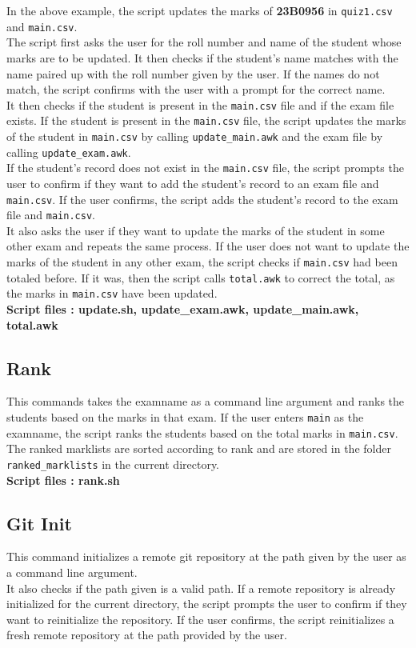 \documentclass{article}
\begin{document}
In the above example, the script updates the marks of \textbf{23B0956} in \verb"quiz1.csv" and \verb"main.csv".\\
The script first asks the user for the roll number and name of the student whose marks are to be updated. It then checks if the student's name matches with the name paired up with the roll number given by the user. If the names do not match, the script confirms with the user with a prompt for the correct name.\\
It then checks if the student is present in the \verb"main.csv" file and if the exam file exists. If the student is present in the \verb"main.csv" file, the script updates the marks of the student in \verb"main.csv" by calling \verb"update_main.awk" and the exam file by calling \verb"update_exam.awk".\\
If the student's record does not exist in the \verb"main.csv" file, the script prompts the user to confirm if they want to add the student's record to an exam file and \verb"main.csv". If the user confirms, the script adds the student's record to the exam file and \verb"main.csv".\\
It also asks the user if they want to update the marks of the student in some other exam and repeats the same process. If the user does not want to update the marks of the student in any other exam, the script checks if \verb"main.csv" had been totaled before. If it was, then the script calls \verb"total.awk" to correct the total, as the marks in \verb"main.csv" have been updated.\\

\textbf{Script files : update.sh, update\_exam.awk, update\_main.awk, total.awk} 

\subsection{Rank}
This commands takes the examname as a command line argument and ranks the students based on the marks in that exam.
If the user enters \verb"main" as the examname, the script ranks the students based on the total marks in \verb"main.csv". The ranked marklists are sorted according to rank and are stored in the folder \verb"ranked_marklists" in the current directory.\\

\textbf{Script files : rank.sh }

\subsection{Git Init}
This command initializes a remote git repository at the path given by the user as a command line argument.\\
It also checks if the path given is a valid path. If a remote repository is already initialized for the current directory, the script prompts the user to confirm if they want to reinitialize the repository.
If the user confirms, the script reinitializes a fresh remote repository at the path provided by the user.\\ 
\end{document}
